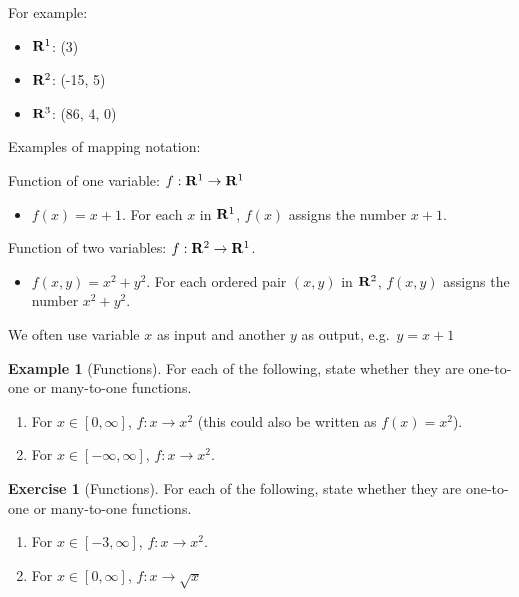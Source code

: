 \documentclass[
]{book}
\providecommand{\tightlist}{%
  \setlength{\itemsep}{0pt}\setlength{\parskip}{0pt}}
\theoremstyle{definition}
\theoremstyle{definition}
\newtheorem{example}{Example}[chapter]
\theoremstyle{definition}
\newtheorem{exercise}{Exercise}[chapter]
\theoremstyle{remark}
\begin{document}
For example:

\begin{itemize}
\tightlist
\item
  \({\bf R}^1\): (3)
\item
  \({\bf R}^2\): (-15, 5)
\item
  \({\bf R}^3\): (86, 4, 0)
\end{itemize}

Examples of mapping notation:

Function of one variable: \(f:{\bf R}^1\to{\bf R}^1\)

\begin{itemize}
\tightlist
\item
  \(f(x)=x+1\). For each \(x\) in \({\bf R}^1\), \(f(x)\) assigns the number \(x+1\).
\end{itemize}

Function of two variables: \(f: {\bf R}^2\to{\bf R}^1\).

\begin{itemize}
\tightlist
\item
  \(f(x,y)=x^2+y^2\). For each ordered pair \((x,y)\) in \({\bf R}^2\), \(f(x,y)\) assigns the number \(x^2+y^2\).
\end{itemize}

We often use variable \(x\) as input and another \(y\) as output, e.g.~\(y=x+1\)

\begin{example}[Functions]
\protect\hypertarget{exm:functions}{}{\label{exm:functions} {} }
For each of the following, state whether they are one-to-one or many-to-one functions.

\begin{enumerate}
\def\labelenumi{\arabic{enumi}.}
\item
  For \(x \in [0,\infty]\), \(f : x \rightarrow x^2\) (this could also be written as \(f(x) = x^2\)).
\item
  For \(x \in [-\infty, \infty]\), \(f: x \rightarrow x^2\).
\end{enumerate}
\end{example}

\begin{exercise}[Functions]
\protect\hypertarget{exr:functions1}{}{\label{exr:functions1} {} }
For each of the following, state whether they are one-to-one or many-to-one functions.

\begin{enumerate}
\def\labelenumi{\arabic{enumi}.}
\item
  For \(x \in [-3, \infty]\), \(f: x \rightarrow x^2\).
\item
  For \(x \in [0, \infty]\), \(f: x \rightarrow \sqrt{x}\)
\end{enumerate}
\end{exercise}
\end{document}
